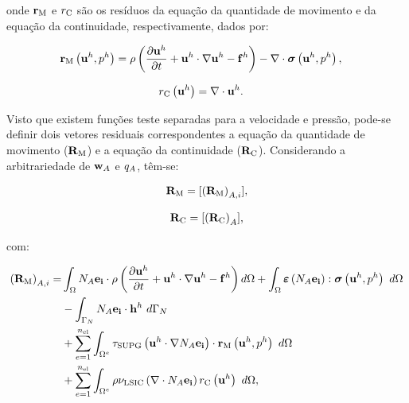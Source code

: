\documentclass[tese_patricia]{subfiles}%
\begin{document}
\noindent onde $\mathbf{r}_{\mathrm{M}}$ e ${r}_{\mathrm{C}}$ são os resíduos da equação da quantidade de movimento e da equação da continuidade, respectivamente, dados por:

\begin{align}
\mathbf{r}_{\mathrm{M}}\left(\mathbf{u}^h,p^h\right)&=\rho\left(\frac{\partial\mathbf{u}^h}{\partial t}+\mathbf{u}^h\cdot \nabla\mathbf{u}^h - \mathbf{f}^h\right) - \nabla \cdot \boldsymbol{\sigma}\left(\mathbf{u}^h,p^h\right),
\end{align}

\noindent

\begin{align}
{r}_{\mathrm{C}}\left(\mathbf{u}^h\right)&=\nabla \cdot \mathbf{u}^h.
\end{align}

Visto que existem funções teste separadas para a velocidade e pressão, pode-se definir dois vetores residuais correspondentes a equação da quantidade de movimento ($\mathbf{R}_\mathrm{M}$) e a equação da continuidade ($\mathbf{R}_\mathrm{C}$). Considerando a arbitrariedade de $\mathbf{w}_{A}$ e $q_{A}$, têm-se:

\begin{align}
\mathbf{R}_\mathrm{M}  = [\left(\mathbf{R}_\mathrm{M}\right)_{A,i}],
\end{align}

\begin{align}
	\mathbf{R}_\mathrm{C} =  [\left(\mathbf{R}_\mathrm{C}\right)_{A}],
\end{align}
	
\noindent com:

\begin{align}
	\begin{split}
	\left(\mathbf{R}_\mathrm{M}\right)_{A,i} =&\int_{\Omega} N_{A}\mathbf{e_i} \cdot \rho\left(\frac{\partial\mathbf{u}^h}{\partial t}+\mathbf{u}^h\cdot \nabla\mathbf{u}^h - \mathbf{f}^h\right) d\Omega +\int_{\Omega} \bm{\varepsilon} \left(N_{A}\mathbf{e_i}\right) : \boldsymbol{\sigma} \left(\mathbf{u}^h,p^h\right)\ d\Omega\\ &
	- \int_{\Gamma_N}N_{A}\mathbf{e_i} \cdot \mathbf{h}^h\ d\Gamma_{N}\\ 
	&+ \sum_{e=1}^{n_{\mathrm{el}}} \int_{\Omega^e} \tau_{\mathrm{SUPG}} \left(\mathbf{u}^h \cdot \nabla N_{A}\mathbf{e_i}\right) \cdot \mathbf{r}_{\mathrm{M}}\left(\mathbf{u}^h,p^h \right)\  d\Omega\\
	&+ \sum_{e=1}^{n_{\mathrm{el}}} \int_{\Omega^e} \rho \nu_{\mathrm{LSIC}} \left(\nabla \cdot N_{A}\mathbf{e_i}\right) {r}_{\mathrm{C}}\left(\mathbf{u}^h\right)\  d\Omega  ,
	\end{split}
\end{align}
\end{document}
